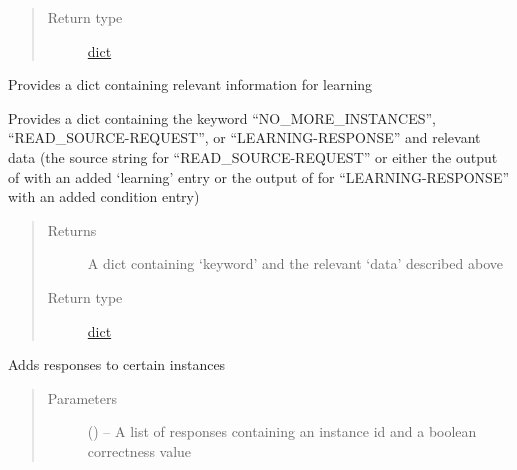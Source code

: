 \documentclass[letterpaper,10pt,english]{sphinxmanual}
\begin{document}
\begin{fulllineitems}
\begin{fulllineitems}
\begin{quote}
\begin{description}
\item[{Return type}] \leavevmode
\href{https://docs.python.org/2/library/stdtypes.html\#dict}{dict}

\end{description}\end{quote}

\end{fulllineitems}


\begin{fulllineitems}
\label{\detokenize{controller:controller.Controller.provide_learning}}
Provides a dict containing relevant information for learning

Provides a dict containing the keyword ``NO\_MORE\_INSTANCES'', ``READ\_SOURCE-REQUEST'', or ``LEARNING-RESPONSE'' and relevant data (the source string for ``READ\_SOURCE-REQUEST'' or either the output of  with an added `learning' entry or the output of  for ``LEARNING-RESPONSE'' with an added condition entry)
\begin{quote}\begin{description}
\item[{Returns}] \leavevmode
A dict containing `keyword' and the relevant `data' described above

\item[{Return type}] \leavevmode
\href{https://docs.python.org/2/library/stdtypes.html\#dict}{dict}

\end{description}\end{quote}

\end{fulllineitems}


\begin{fulllineitems}
\label{\detokenize{controller:controller.Controller.validate}}
Adds responses to certain instances
\begin{quote}\begin{description}
\item[{Parameters}] \leavevmode
{} (\href{https://docs.python.org/2/library/functions.html\#list}{}\sphinxstyleliteralemphasis{(}\href{https://docs.python.org/2/library/stdtypes.html\#dict}{}\sphinxstyleliteralemphasis{)}\sphinxstyleliteralemphasis{}) -- A list of responses containing an instance id and a boolean correctness value

\end{description}\end{quote}

\end{fulllineitems}


\end{fulllineitems}
\end{document}
